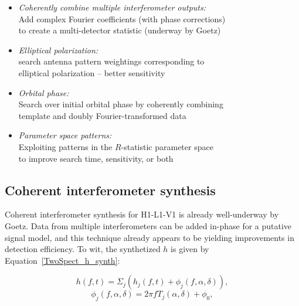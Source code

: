 \begin{itemize}
\item \emph{Coherently combine multiple interferometer outputs: }\\
Add complex Fourier coefficients (with phase corrections)\\
to create a multi-detector statistic (underway by Goetz)
\item \emph{Elliptical polarization:}\\
search antenna pattern weightings corresponding to\\
elliptical polarization -- better sensitivity
\item \emph{Orbital phase:}\\
Search over initial orbital phase by coherently combining\\
template and doubly Fourier-transformed data
\item \emph{Parameter space patterns:}\\
Exploiting patterns in the $R$-statistic parameter space\\
to improve search time, sensitivity, or both
\end{itemize}



\subsection{Coherent interferometer synthesis}
Coherent interferometer synthesis for H1-L1-V1 is already well-underway by Goetz.
Data from multiple interferometers can be added in-phase for a putative signal model, and this technique already appears to be yielding improvements in detection efficiency.
To wit, the synthetized $h$ is given by Equation~\ref{TwoSpect_h_synth}:

\begin{equation}
h(f,t)=\Sigma_{j}\left(h_{j}(f,t)+\phi_{j}(f,\alpha,\delta)\right),
\label{TwoSpect_h_synth}
\end{equation}
\begin{equation}
\phi_{j}(f,\alpha,\delta)=2\pi fT_{j}(\alpha,\delta)+\phi_{0},
\label{TwoSpect_phase_synth}
\end{equation}

